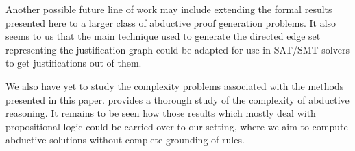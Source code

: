 Another possible future line of work may include extending the formal results
presented here to a larger class of abductive proof generation problems. 
It also seems to us that the main technique used to generate the directed edge
set representing the justification graph could be adapted for use in SAT/SMT
solvers to get justifications out of them. 

We also have yet to study the complexity problems
associated with the methods presented in this paper. \cite{DBLP:journals/tcs/EiterGL97} provides a thorough study 
of the complexity of abductive reasoning. It remains to be seen how those results 
which mostly deal with propositional logic could be carried over to our setting, where
we aim to compute abductive solutions without complete grounding of rules. %




